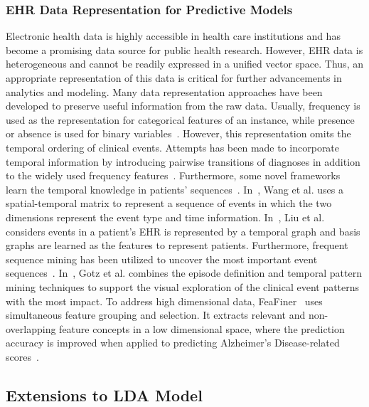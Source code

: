 \subsubsection{EHR Data Representation for Predictive Models} 
Electronic health data is highly accessible in health care institutions and has become a promising data source for public health research.
However, EHR data is heterogeneous and cannot be readily expressed in a unified vector space.
Thus, an appropriate representation of this data is critical for further advancements in analytics and modeling.
Many data representation approaches have been developed to preserve useful information from the raw data.
Usually, frequency is used as the representation for categorical features of an instance, while presence or absence is used for binary variables~\cite{ng_personalized_2015, huang_toward_2014}.
However, this representation omits the temporal ordering of clinical events.
Attempts has been made to incorporate temporal information by introducing pairwise transitions of diagnoses in addition to the widely used frequency features~\cite{zhang_mseq_2015}.
Furthermore, some novel frameworks learn the temporal knowledge in patients' sequences~\cite{wang_towards_2012, wang_framework_2012, liu_temporal_2015}.
In~\cite{wang_framework_2012}, Wang et al. uses a spatial-temporal matrix to represent a sequence of events in which the two dimensions represent the event type and time information.
In~\cite{liu_temporal_2015}, Liu et al. considers events in a patient's EHR is represented by a temporal graph and basis graphs are learned as the features to represent patients.
Furthermore, frequent sequence mining has been utilized to uncover the most important event sequences~\cite{gotz_methodology_2014, perer_frequence:_2014, perer_mining_2015}.
In~\cite{gotz_methodology_2014}, Gotz et al. combines the episode definition and temporal pattern mining techniques to support the visual exploration of the clinical event patterns with the most impact.
To address high dimensional data, FeaFiner~\cite{zhou_feafiner:_2013} uses simultaneous feature grouping and selection.
It extracts relevant and non-overlapping feature concepts in a low dimensional space, where the prediction accuracy is improved when applied to predicting Alzheimer's Disease-related scores~\cite{zhou_feafiner:_2013}.




\subsection{Extensions to LDA Model}

